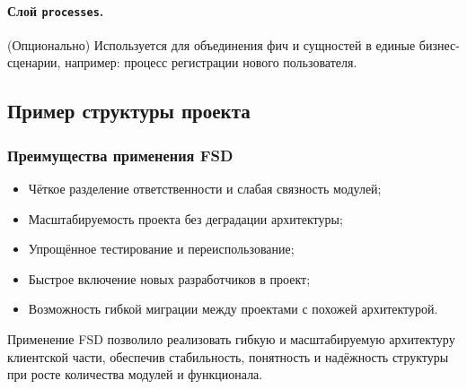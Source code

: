 \paragraph{Слой \texttt{processes}.}  
(Опционально) Используется для объединения фич и сущностей в единые бизнес-сценарии, например: процесс регистрации нового пользователя.

\subsection{Пример структуры проекта}


\subsubsection{Преимущества применения FSD}

\begin{itemize}
  \item Чёткое разделение ответственности и слабая связность модулей;
  \item Масштабируемость проекта без деградации архитектуры;
  \item Упрощённое тестирование и переиспользование;
  \item Быстрое включение новых разработчиков в проект;
  \item Возможность гибкой миграции между проектами с похожей архитектурой.
\end{itemize}

Применение FSD позволило реализовать гибкую и масштабируемую архитектуру клиентской части, обеспечив стабильность, понятность и надёжность структуры при росте количества модулей и функционала.
